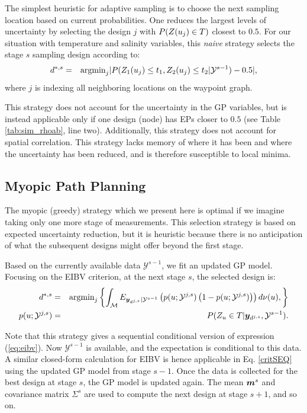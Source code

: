 \documentclass[aoas]{imsart}
\begin{document}
The simplest heuristic for adaptive sampling is to choose the next
sampling location based on current probabilities. One reduces the largest levels of uncertainty by selecting the design $j$ with $P(Z(u_j) \in T)$ closest to $0.5$.
For our situation with temperature and salinity variables, this {\it{naive}} strategy selects the stage $s$ sampling design according to:
\begin{eqnarray}\label{critNaive}
    d^{*,s} &=& \mbox{argmin}_{j} |P(Z_1(\x_j) \leq t_1, Z_2(\x_j) \leq t_2 | \mathcal{Y}^{s-1})-0.5|, \nonumber
\end{eqnarray}
where $j$ is indexing all neighboring locations on the waypoint graph.

This strategy does not account for the uncertainty in the GP variables, but is instead applicable only if one design (node) has EPs closer to
$0.5$ (see Table \ref{tab:sim_rhoab}, line two). Additionally, this strategy does not
account for spatial correlation. This strategy lacks memory of where
it has been and where the uncertainty has been reduced, and is therefore
susceptible to local minima.

\subsection{Myopic Path Planning}
\label{sec:myopic}

The myopic (greedy) strategy which we present here is optimal if we
imagine taking only one more stage of measurements. This selection
strategy is based on expected uncertainty reduction, but it is heuristic because there is no anticipation of what the subsequent designs might
offer beyond the first stage.

Based on the currently available data $\mathcal{Y}^{s-1}$, we
fit an updated GP model. Focusing on the EIBV criterion, at the next stage $s$, the selected design is:
\begin{eqnarray}\label{critSEQ}
    d^{*,s} &=& \mbox{argmin}_{j} \left\{ \int_{\mathcal{M}} E_{\by_{d^{j,s}}|\mathcal{Y}^{s-1}} \left( p(\x;\mathcal{Y}^{j,s})\left( 1-p(\x;\mathcal{Y}^{j,s})\right) \right) d\mes(u), \right\} \\
    p(\x;\mathcal{Y}^{j,s}) &=& P(Z_u \in T |\by_{d^{j,s}},\mathcal{Y}^{s-1}). \nonumber
\end{eqnarray}

Note that this strategy gives a sequential conditional version of
expression (\ref{eq:eibv}). Now $\mathcal{Y}^{s-1}$ is available, and
the expectation is conditional to this data. A similar closed-form calculation
for EIBV is hence applicable in Eq.
\eqref{critSEQ} using the
updated GP model from stage $s-1$. Once the data is collected for the
best design at stage $s$, the GP model is updated again. The mean ${\boldsymbol m}^{s}$ and
covariance matrix $\Sigma^{s}$ are used to compute the next design at
stage $s+1$, and so on.
\end{document}
